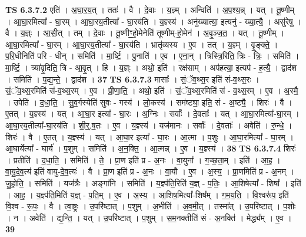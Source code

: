 \documentclass[17pt]{extarticle}
\begin{document}
                  \newline
                                \textbf{ TS 6.3.7.2} \newline
                  एति॑ । अ॒घा॒र॒य॒त् । ततः॑ । वै । दे॒वाः । य॒ज्ञ्म् । अन्विति॑ । अ॒प॒श्य॒न्न् । यत् । तू॒ष्णीम् । आ॒घा॒रमित्या᳚ - घा॒रम् । आ॒घा॒रय॒तीत्या᳚ - घा॒रय॑ति । य॒ज्ञ्स्य॑ । अनु॑ख्यात्या॒ इत्यनु॑ - ख्या॒त्यै॒ । असु॑रेषु । वै । य॒ज्ञ्ः । आ॒सी॒त् । तम् । दे॒वाः । तू॒ष्णीꣳ॒॒हो॒मेनेति॑ तूष्णीम्-हो॒मेन॑ । अ॒वृ॒ञ्ज॒त॒ । यत् । तू॒ष्णीम् । आ॒घा॒रमित्या᳚ - घा॒रम् । आ॒घा॒रय॒तीत्या᳚ - घा॒रय॑ति । भ्रातृ॑व्यस्य । ए॒व । तत् । य॒ज्ञ्म् । वृ॒ङ्क्ते॒ । प॒रि॒धीनिति॑ परि - धीन् । समिति॑ । मा॒र्ष्टि॒ । पु॒नाति॑ । ए॒व । ए॒ना॒न् । त्रिस्त्रि॒रिति॒ त्रिः - त्रिः॒ । समिति॑ । मा॒र्ष्टि॒ । त्र्या॑वृ॒दिति॒ त्रि - आ॒वृ॒त् । हि । य॒ज्ञ्ः । अथो॒ इति॑ । रक्ष॑साम् । अप॑हत्या॒ इत्यप॑ - ह॒त्यै॒ । द्वाद॑श । समिति॑ । प॒द्य॒न्ते॒ । द्वाद॑श । \textbf{  37} \newline
                  \newline
                                \textbf{ TS 6.3.7.3} \newline
                  मासाः᳚ । सं॒ॅव॒थ्स॒र इति॑ सं-व॒थ्स॒रः । सं॒ॅव॒थ्स॒रमिति॑ सं-व॒थ्स॒रम् । ए॒व । प्री॒णा॒ति॒ । अथो॒ इति॑ । सं॒ॅव॒थ्स॒रमिति॑ सं - व॒थ्स॒रम् । ए॒व । अ॒स्मै॒ । उपेति॑ । द॒धा॒ति॒ । सु॒व॒र्गस्येति॑ सुवः - गस्य॑ । लो॒कस्य॑ । सम॑ष्ट्या॒ इति॒ सं - अ॒ष्ट्यै॒ । शिरः॑ । वै । ए॒तत् । य॒ज्ञ्स्य॑ । यत् । आ॒घा॒र इत्या᳚ - घा॒रः । अ॒ग्निः । सर्वाः᳚ । दे॒वताः᳚ । यत् । आ॒घा॒रमित्या᳚-घा॒रम् । आ॒घा॒रय॒तीत्या᳚-घा॒रय॑ति । शी॒र्॒.ष॒तः । ए॒व । य॒ज्ञ्स्य॑ । यज॑मानः । सर्वाः᳚ । दे॒वताः᳚ । अवेति॑ । रु॒न्धे॒ । शिरः॑ । वै । ए॒तत् । य॒ज्ञ्स्य॑ । यत् । आ॒घा॒र इत्या᳚ - घा॒रः । आ॒त्मा । प॒शुः । आ॒घा॒रमित्या᳚ - घा॒रम् । आ॒घार्येत्या᳚ - घार्य॑ । प॒शुम् । समिति॑ । अ॒न॒क्ति॒ । आ॒त्मन्न् । ए॒व । य॒ज्ञ्स्य॑ । \textbf{  38} \newline
                  \newline
                                \textbf{ TS 6.3.7.4} \newline
                  शिरः॑ । प्रतीति॑ । द॒धा॒ति॒ । समिति॑ । ते॒ । प्रा॒ण इति॑ प्र - अ॒नः । वा॒युना᳚ । ग॒च्छ॒ता॒म् । इति॑ । आ॒ह॒ । वा॒यु॒दे॒व॒त्य॑ इति॑ वायु-दे॒व॒त्यः॑ । वै । प्रा॒ण इति॑ प्र - अ॒नः । वा॒यौ । ए॒व । अ॒स्य॒ । प्रा॒णमिति॑ प्र - अ॒नम् । जु॒हो॒ति॒ । समिति॑ । यज॑त्रैः । अङ्गा॑नि । समिति॑ । य॒ज्ञ्प॑ति॒रिति॑ य॒ज्ञ् - प॒तिः॒ । आ॒शिषेत्या᳚ - शिषा᳚ । इति॑ । आ॒ह॒ । य॒ज्ञ्प॑ति॒मिति॑ य॒ज्ञ् - प॒ति॒म् । ए॒व । अ॒स्य॒ । आ॒शिष॒मित्या᳚-शिष᳚म् । ग॒म॒य॒ति॒ । वि॒श्वरू॑प॒ इति॑ वि॒श्व - रू॒पः॒ । वै । त्वा॒ष्ट्रः । उ॒परि॑ष्टात् । प॒शुम् । अ॒भीति॑ । अ॒व॒मी॒त् । तस्मा᳚त् । उ॒परि॑ष्टात् । प॒शोः । न । अवेति॑ । द्य॒न्ति॒ । यत् । उ॒परि॑ष्टात् । प॒शुम् । स॒म॒नक्तीति॑ सं - अ॒नक्ति॑ । मेद्ध्य᳚म् । ए॒व । \textbf{  39} \newline
\end{document}
